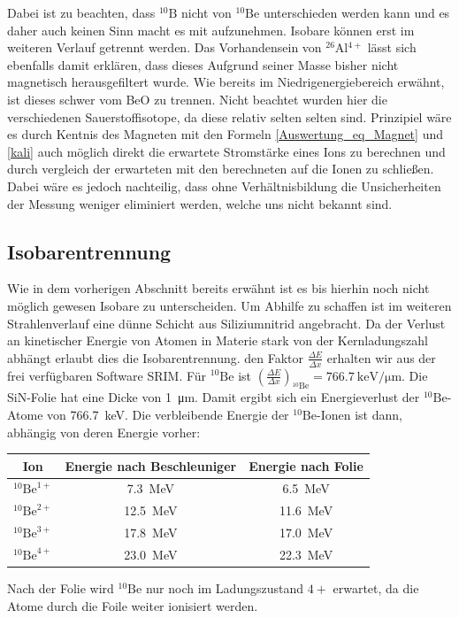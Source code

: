 Dabei ist zu beachten, dass $^{10}\text{B}$ nicht von $^{10}\text{Be}$ unterschieden werden kann und es daher auch keinen Sinn macht es mit aufzunehmen.
Isobare können erst im weiteren Verlauf getrennt werden.
Das Vorhandensein von $^{26}$Al$^{4+}$ lässt sich ebenfalls damit erklären, dass dieses Aufgrund seiner Masse bisher nicht magnetisch herausgefiltert wurde.
Wie bereits im Niedrigenergiebereich erwähnt, ist dieses schwer vom BeO zu trennen.
Nicht beachtet wurden hier die verschiedenen Sauerstoffisotope, da diese relativ selten selten sind.
Prinzipiel wäre es durch Kentnis des Magneten mit den Formeln \ref{Auswertung_eq_Magnet} und \ref{kali} auch möglich direkt die erwartete Stromstärke eines Ions zu berechnen und durch vergleich der erwarteten mit den berechneten auf die Ionen zu schließen.
Dabei wäre es jedoch nachteilig, dass ohne Verhältnisbildung die Unsicherheiten der Messung weniger eliminiert werden, welche uns nicht bekannt sind.

\clearpage

\subsection{Isobarentrennung}
Wie in dem vorherigen Abschnitt bereits erwähnt ist es bis hierhin noch nicht möglich gewesen Isobare zu unterscheiden.
Um Abhilfe zu schaffen ist im weiteren Strahlenverlauf eine dünne Schicht aus Siliziumnitrid angebracht.
Da der Verlust an kinetischer Energie von Atomen in Materie stark von der Kernladungszahl abhängt erlaubt dies die Isobarentrennung.
den Faktor $\frac{\Delta E}{\Delta x}$ erhalten wir aus der frei verfügbaren Software SRIM.
Für $^{10}\text{Be}$ ist $\left (\frac{\Delta E}{\Delta x}\right )_{^{10}\text{Be}} = \SI{766.7}{\kilo\electronvolt\per\micro\metre}$.
Die SiN-Folie hat eine Dicke von \SI{1}{\micro\metre}.
Damit ergibt sich ein Energieverlust der $^{10}\text{Be}$-Atome von \SI{766.7}{\kilo\electronvolt}.
Die verbleibende Energie der $^{10}\text{Be}$-Ionen ist dann, abhängig von deren Energie vorher:
\begin{center}
  \begin{tabular}{|c|c|c|}
    \hline
    Ion & Energie nach Beschleuniger & Energie nach Folie \\
    \hline
    $^{10}\text{Be}^{1+}$ & \SI{7.3}{\mega\electronvolt}  & \SI{6.5}{\mega\electronvolt}  \\
    $^{10}\text{Be}^{2+}$ & \SI{12.5}{\mega\electronvolt} & \SI{11.6}{\mega\electronvolt} \\
    $^{10}\text{Be}^{3+}$ & \SI{17.8}{\mega\electronvolt} & \SI{17.0}{\mega\electronvolt} \\
    $^{10}\text{Be}^{4+}$ & \SI{23.0}{\mega\electronvolt} & \SI{22.3}{\mega\electronvolt} \\
    \hline
  \end{tabular}
  \label{Auswertung_tab_Ionenenergien_nach_Folie}
\end{center}
Nach der Folie wird $^{10}\text{Be}$ nur noch im Ladungszustand $4+$ erwartet, da die Atome durch die Foile weiter ionisiert werden.

